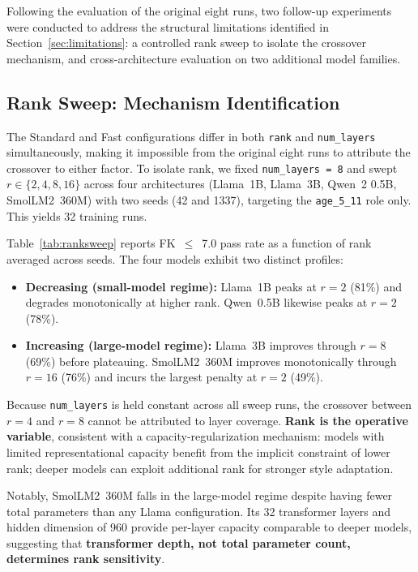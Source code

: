 \documentclass[ASNA,twocolumn]{USG} %
\begin{document}
Following the evaluation of the original eight runs, two follow-up experiments were conducted to address the structural limitations identified in Section~\ref{sec:limitations}: a controlled rank sweep to isolate the crossover mechanism, and cross-architecture evaluation on two additional model families.

\subsection{Rank Sweep: Mechanism Identification}\label{sec:ranksweep}

The Standard and Fast configurations differ in both \texttt{rank} and \texttt{num\_layers} simultaneously, making it impossible from the original eight runs to attribute the crossover to either factor. To isolate rank, we fixed \texttt{num\_layers~=~8} and swept $r \in \{2, 4, 8, 16\}$ across four architectures (Llama~1B, Llama~3B, Qwen~2 0.5B, SmolLM2~360M) with two seeds (42 and 1337), targeting the \texttt{age\_5\_11} role only. This yields 32 training runs.

Table~\ref{tab:ranksweep} reports FK~$\leq$~7.0 pass rate as a function of rank averaged across seeds. The four models exhibit two distinct profiles:

\begin{itemize}
    \item \textbf{Decreasing (small-model regime):} Llama~1B peaks at $r=2$ (81\%) and degrades monotonically at higher rank. Qwen~0.5B likewise peaks at $r=2$ (78\%).
    \item \textbf{Increasing (large-model regime):} Llama~3B improves through $r=8$ (69\%) before plateauing. SmolLM2~360M improves monotonically through $r=16$ (76\%) and incurs the largest penalty at $r=2$ (49\%).
\end{itemize}

Because \texttt{num\_layers} is held constant across all sweep runs, the crossover between $r=4$ and $r=8$ cannot be attributed to layer coverage. \textbf{Rank is the operative variable}, consistent with a capacity-regularization mechanism: models with limited representational capacity benefit from the implicit constraint of lower rank; deeper models can exploit additional rank for stronger style adaptation.

Notably, SmolLM2~360M falls in the large-model regime despite having fewer total parameters than any Llama configuration. Its 32 transformer layers and hidden dimension of 960 provide per-layer capacity comparable to deeper models, suggesting that \textbf{transformer depth, not total parameter count, determines rank sensitivity}.
\end{document}

